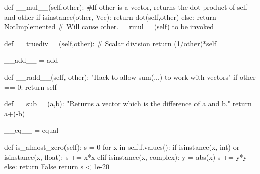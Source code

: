 \documentclass[
  letterpaper,
  DIV=11,
  numbers=noendperiod]{scrartcl}
\newenvironment{Shaded}{\begin{snugshade}}{\end{snugshade}}
\newcommand{\BuiltInTok}[1]{\textcolor[rgb]{0.00,0.23,0.31}{#1}}
\newcommand{\CommentTok}[1]{\textcolor[rgb]{0.37,0.37,0.37}{#1}}
\newcommand{\ControlFlowTok}[1]{\textcolor[rgb]{0.00,0.23,0.31}{#1}}
\newcommand{\DecValTok}[1]{\textcolor[rgb]{0.68,0.00,0.00}{#1}}
\newcommand{\FloatTok}[1]{\textcolor[rgb]{0.68,0.00,0.00}{#1}}
\newcommand{\FunctionTok}[1]{\textcolor[rgb]{0.28,0.35,0.67}{#1}}
\newcommand{\KeywordTok}[1]{\textcolor[rgb]{0.00,0.23,0.31}{#1}}
\newcommand{\NormalTok}[1]{\textcolor[rgb]{0.00,0.23,0.31}{#1}}
\newcommand{\OperatorTok}[1]{\textcolor[rgb]{0.37,0.37,0.37}{#1}}
\newcommand{\VariableTok}[1]{\textcolor[rgb]{0.07,0.07,0.07}{#1}}
\begin{document}
\begin{Shaded}
\begin{Highlighting}[numbers=left,,]
    \KeywordTok{def} \FunctionTok{\_\_mul\_\_}\NormalTok{(}\VariableTok{self}\NormalTok{,other):}
        \CommentTok{\#If other is a vector, returns the dot product of self and other}
        \ControlFlowTok{if} \BuiltInTok{isinstance}\NormalTok{(other, Vec):}
            \ControlFlowTok{return}\NormalTok{ dot(}\VariableTok{self}\NormalTok{,other)}
        \ControlFlowTok{else}\NormalTok{:}
            \ControlFlowTok{return} \VariableTok{NotImplemented}  \CommentTok{\#  Will cause other.\_\_rmul\_\_(self) to be invoked}

    \KeywordTok{def} \FunctionTok{\_\_truediv\_\_}\NormalTok{(}\VariableTok{self}\NormalTok{,other):  }\CommentTok{\# Scalar division}
        \ControlFlowTok{return}\NormalTok{ (}\DecValTok{1}\OperatorTok{/}\NormalTok{other)}\OperatorTok{*}\VariableTok{self}

    \FunctionTok{\_\_add\_\_} \OperatorTok{=}\NormalTok{ add}

    \KeywordTok{def} \FunctionTok{\_\_radd\_\_}\NormalTok{(}\VariableTok{self}\NormalTok{, other):}
        \CommentTok{"Hack to allow sum(...) to work with vectors"}
        \ControlFlowTok{if}\NormalTok{ other }\OperatorTok{==} \DecValTok{0}\NormalTok{:}
            \ControlFlowTok{return} \VariableTok{self}

    \KeywordTok{def} \FunctionTok{\_\_sub\_\_}\NormalTok{(a,b):}
        \CommentTok{"Returns a vector which is the difference of a and b."}
        \ControlFlowTok{return}\NormalTok{ a}\OperatorTok{+}\NormalTok{(}\OperatorTok{{-}}\NormalTok{b)}

    \FunctionTok{\_\_eq\_\_} \OperatorTok{=}\NormalTok{ equal}

    \KeywordTok{def}\NormalTok{ is\_almost\_zero(}\VariableTok{self}\NormalTok{):}
\NormalTok{        s }\OperatorTok{=} \DecValTok{0}
        \ControlFlowTok{for}\NormalTok{ x }\KeywordTok{in} \VariableTok{self}\NormalTok{.f.values():}
            \ControlFlowTok{if} \BuiltInTok{isinstance}\NormalTok{(x, }\BuiltInTok{int}\NormalTok{) }\KeywordTok{or} \BuiltInTok{isinstance}\NormalTok{(x, }\BuiltInTok{float}\NormalTok{):}
\NormalTok{                s }\OperatorTok{+=}\NormalTok{ x}\OperatorTok{*}\NormalTok{x}
            \ControlFlowTok{elif} \BuiltInTok{isinstance}\NormalTok{(x, }\BuiltInTok{complex}\NormalTok{):}
\NormalTok{                y }\OperatorTok{=} \BuiltInTok{abs}\NormalTok{(x)}
\NormalTok{                s }\OperatorTok{+=}\NormalTok{ y}\OperatorTok{*}\NormalTok{y}
            \ControlFlowTok{else}\NormalTok{: }\ControlFlowTok{return} \VariableTok{False}
        \ControlFlowTok{return}\NormalTok{ s }\OperatorTok{\textless{}} \FloatTok{1e{-}20}


\end{Highlighting}
\end{Shaded}
\end{document}
